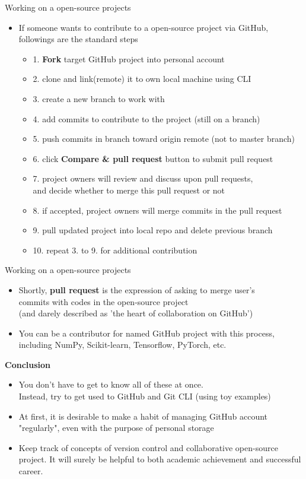 \documentclass[11pt, xelatex]{beamer}
\newcommand{\bi}{\begin{itemize}}
\newcommand{\ei}{\end{itemize}}
\begin{document}
\begin{frame}{Working on a open-source projects}
\bi
\item If someone wants to contribute to a open-source project via GitHub, followings are the standard steps
    \bi
    \item[1.]\textbf{Fork} target GitHub project into personal account
    \item[2.]clone and link(remote) it to own local machine using CLI
    \item[3.]create a new branch to work with
    \item[4.]add commits to contribute to the project (still on a branch)
    \item[5.]push commits in branch toward origin remote (not to master branch)
    \item[6.]click \textbf{Compare \& pull request} button to submit pull request
    \item[7.]project owners will review and discuss upon pull requests,\\
    and decide whether to merge this pull request or not
    \item[8.]if accepted, project owners will merge commits in the pull request
    \item[9.]pull updated project into local repo and delete previous branch
    \item[10.]repeat 3. to 9. for additional contribution
    \ei
\ei
\end{frame}

\begin{frame}{Working on a open-source projects}
\bi
\item Shortly, \textbf{pull request} is the expression of asking to merge user's\\commits with codes in the open-source project\\
(and darely described as 'the heart of collaboration on GitHub')
\item You can be a contributor for named GitHub project with this process, including NumPy, Scikit-learn, Tensorflow, PyTorch, etc.
\ei
\end{frame}

\begin{frame}{\textbf{Conclusion}}
\bi
\item You don't have to get to know all of these at once.\\Instead, try to get used to GitHub and Git CLI (using toy examples)
\item At first, it is desirable to make a habit of managing GitHub account "regularly", even with the purpose of personal storage
\item Keep track of concepts of version control and collaborative open-source project.
It will surely be helpful to both academic achievement and successful career.
\ei
\end{frame}
\end{document}
